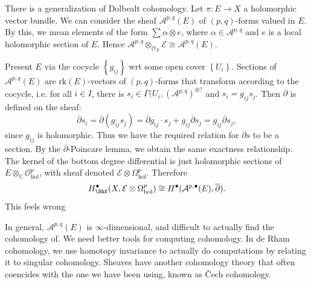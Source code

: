 \begin{remark}
	There is a generalization of Dolbealt cohomology. Let $\pi : E \to X$ a holomorphic vector bundle. We can consider the sheaf $\mathcal{A} ^{p,q} (E)$ of $(p,q)$-forms valued in $E$. By this, we mean elements of the form $\sum \alpha \otimes e$, where $\alpha \in \mathcal{A} ^{p,q} $ and $e$ is a local holomorphic section of $E$. Hence $\mathcal{A} ^{p,q} \otimes_{\mathcal{O} _X} \mathcal{E} \cong \mathcal{A} ^{p,q} (E)$.

	Present $E$ via the cocycle $\left\{ g_{ij}  \right\} $ wrt some open cover $\left\{ U_i \right\} $. Sections of $\mathcal{A} ^{p,q} (E)$ are $\mathrm{rk}(E)$-vectors of $(p,q)$-forms that transform according to the cocycle, i.e. for all $i\in I$, there is $s_i\in\Gamma (U_i, (\mathcal{A} ^{p,q} )^{\oplus ?} $ and $s_i = g_{ij} s_j$. Then $\overline{\partial } $ is defined on the sheaf:
	\[
		\overline{\partial } s_i = \overline{\partial } (g_{ij} s_j) = \overline{\partial } g_{ij} \cdot s_j + g_{ij} \overline{\partial } s_j = g_{ij} \overline{\partial } s_j,
	\]
since $g_{ij} $ is holomorphic. Thus we have the required relation for $\overline{\partial } s$ to be a section. By the $\overline{\partial } $-Poincare lemma, we obtain the same exactness relationship. The kernel of the bottom degree differential is just holomorphic sections of $E \otimes _\mathbb{C} \mathcal{O} ^p_{\mathrm{hol} } $, with sheaf denoted $\mathcal{E} \otimes \Omega ^p_{\mathrm{hol} } $. Therefore
\[
	H^{\bullet}_{\Shf }(X,\mathcal{E} \otimes \Omega ^p_{\mathrm{hol} })\cong H^{\bullet}(\mathcal{A} ^{p,\bullet}(E) , \overline{\partial } )
.\]
This feels wrong
\end{remark}

In general, $\mathcal{A} ^{p,q} (E)$ is $\infty $-dimensional, and difficult to actually find the cohomology of. We need better tools for computing cohomology. In de Rham cohomology, we use homotopy invariance to actually do computations by relating it to singular cohomology. Sheaves have another cohomology theory that often coencides with the one we have been using, known as \v{C}ech cohomology.
